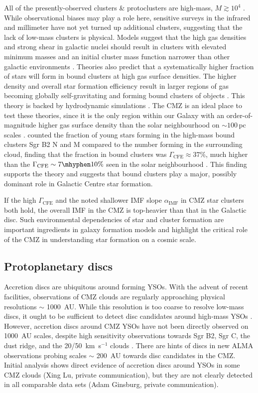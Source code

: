All of the presently-observed clusters \& protoclusters are high-mass, $M\gtrsim10^4$ \msun.
While observational biases may play a role here, sensitive surveys in the infrared and millimeter have not yet turned up additional clusters, suggesting that the lack of low-mass clusters is physical.
Models suggest that the high gas densities and strong shear in galactic nuclei should result in clusters with elevated minimum masses and an initial cluster mass function narrower than other galactic environments \citep{Trujillo-Gomez2019}.
Theories also predict that a systematically higher fraction of stars will form in bound clusters at high gas surface densities.
The higher density and overall star formation efficiency result in larger regions of gas becoming globally self-gravitating and forming bound clusters of objects \citep{Kruijssen2012}.
This theory is backed by hydrodynamic simulations \citep[e.g.][]{Grudic2021}.
The CMZ is an ideal place to test these theories, since it is the only region within our Galaxy with an order-of-magnitude higher gas surface density than the solar neighbourhood on $\sim100$\,pc scales .
\citet{Ginsburg2018a} counted the fraction of young stars forming in the high-mass bound clusters Sgr B2 N and M compared to the number forming in the surrounding cloud, finding that the fraction in bound clusters was $\Gamma_\mathrm{CFE}\approx37\%$, much higher than the $\Gamma_\mathrm{CFE}\sim7\mhyphen10\%$ seen in the solar neighbourhood \citep[e.g.][]{Lada2003}.
This finding supports the theory and suggests that bound clusters play a major, possibly dominant role in Galactic Centre star formation.

If the high $\Gamma_\mathrm{CFE}$ and the noted shallower IMF slope $\alpha_\mathrm{IMF}$ in CMZ star clusters both hold, the overall IMF in the CMZ is top-heavier than that in the Galactic disc.
Such environmental dependencies of star and cluster formation are important ingredients in galaxy formation models and highlight the critical role of the CMZ in understanding star formation on a cosmic scale.

\subsection{Protoplanetary discs} 
\label{sec:ppds}

Accretion discs are ubiquitous around forming YSOs. With the advent of recent facilities, observations of CMZ clouds are regularly approaching physical resolutions $\sim$ 1000~AU. While this resolution is too coarse to resolve low-mass discs, it ought to be sufficient to detect disc candidates around high-mass YSOs \citep[e.g.][]{Ahmadi2019}. However, accretion discs around CMZ YSOs have not been directly observed on 1000~AU scales, despite high sensitivity observations towards Sgr B2, Sgr C, the dust ridge, and the 20/50~km~s$^{-1}$ clouds \citep[e.g.][]{Schworer2019, Lu2021, Walker2021}. There are hints of discs in new ALMA observations probing scales $\sim$ 200~AU towards disc candidates in the CMZ. Initial analysis shows direct evidence of accretion discs around YSOs in some CMZ clouds (Xing Lu, private communication), but they are not clearly detected in all comparable data sets (Adam Ginsburg, private communication). 

